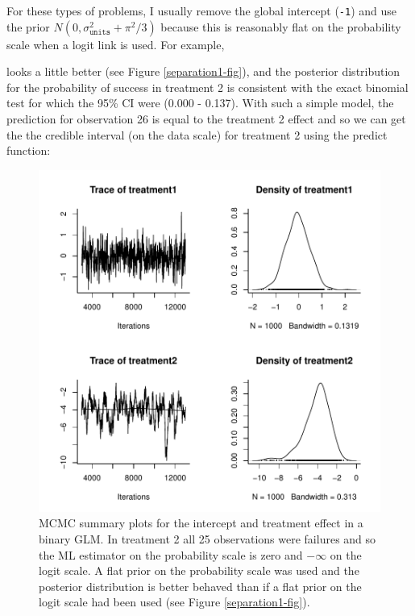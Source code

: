 \documentclass{article}
\begin{document}
For these types of problems, I usually remove the global intercept (\texttt{-1}) and use the prior $N(0, \sigma^{2}_{\texttt{units}}+\pi^2/3)$ because this is reasonably flat on the probability scale when a logit link is used. For example,

\begin{Schunk}
\end{Schunk}


looks a little better (see Figure \ref{separation1-fig}), and the posterior distribution for the probability of success in treatment 2 is consistent with the exact binomial test for which the 95\% CI were (0.000 - 0.137). With such a simple model, the prediction for observation 26 is equal to the  treatment 2 effect and so we can get the the credible interval (on the data scale) for treatment 2 using the predict function:




\begin{figure}[!h]
\begin{center}
\includegraphics{Lecture2-085}
\end{center}
\caption{MCMC summary plots for the intercept and treatment effect in a binary GLM. In treatment 2 all 25 observations were failures and so the ML estimator on the probability scale is zero and $-\infty$ on the logit scale. A flat prior on the probability scale was used and the posterior distribution is better behaved than if a flat prior on the logit scale had been used (see Figure \ref{separation1-fig}).}
\label{separation2-fig}
\end{figure}
\end{document}
